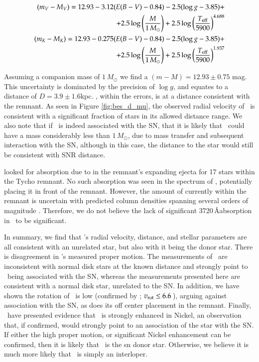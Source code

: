 \begin{eqnarray}
(m_V-M_V)=12.93-3.12(E(B-V)-0.84)-2.5 (\log{g} -3.85)+\\
+2.5\log\left(\frac{M}{1\,M_\odot }\right)+2.5\log\left( \frac{T_{\rm{eff}}}{5900} \right)^{4.688} \nonumber\\
\label{distmodv}
(m_K-M_K)=12.93-0.275(E(B-V)-0.84)-2.5 (\log{g} - 3.85)+\\
+2.5\log\left(\frac{M}{1\,M_\odot }\right)+2.5\log\left( \frac{T_{\rm{eff}}}{5900} \right)^{1.937}\nonumber
\label{distmodk}
\end{eqnarray}

Assuming a companion mass of $1\,M_\odot$ we find a $(m-M)=12.93\pm0.75$ mag. This uncertainty is dominated by the precision of $\log{g}$, and equates to a distance of $D=3.9\pm1.6$kpc. \starg, within the errors, is at a distance consistent with the remnant.  As seen in Figure \ref{fig:bes_d_mu}, the observed radial velocity of \starg\ is consistent with a significant fraction of  stars in its allowed distance range.  We also note that if \starg\ is indeed associated with the SN, that it is likely that \starg\ could have a mass considerably less than $1\,M_\odot$, due to mass transfer and subsequent interaction with the SN, although in this case, the distance to the star would still be consistent with SNR distance. 


\citet{2007PASJ...59..811I} looked for absorption due to  in the remnant's expanding ejecta for 17 stars within the Tycho remnant.  No such absorption was seen in the spectrum of \starg, potentially placing it in front of the remnant. However, the amount of  currently within the remnant is uncertain with predicted column densities spanning several orders of
magnitude \citep[$0.02 - 8.9 \times 10^{15}\rm{\,cm}^{-2}$;][]{Hamilton:1988p522,Ozaki:2006p517}. Therefore, we do not believe the lack of significant  3720\,\AA absorption in \starg\ to be significant.

In summary, we find that \starg's radial velocity, distance, and stellar parameters are all consistent with an unrelated star, but also with it being the donor star. There is disagreement in  \starg's measured proper motion. The measurements of \rl\ are inconsistent with normal disk stars at the known distance and strongly point to \starg\ being associated with the SN, whereas the measurements presented here are consistent with a normal disk star, unrelated to the SN. In addition, we have shown the rotation of \starg\ is low (confirmed by \gh ; $v_{\rm{rot}} \leq 6.6$\,\kms  ), arguing against association with the SN, as does its off center placement in the remnant.  Finally, \gh\ have presented evidence that \starg\ is strongly enhanced in Nickel, an observation that, if confirmed, would strongly point to an association of the star with the SN. If either the high proper motion, or significant Nickel enhancement can be confirmed, then it is likely that \starg\ is the \gls{sn} donor star. Otherwise, we believe it is much more likely that \starg\ is simply an interloper.

